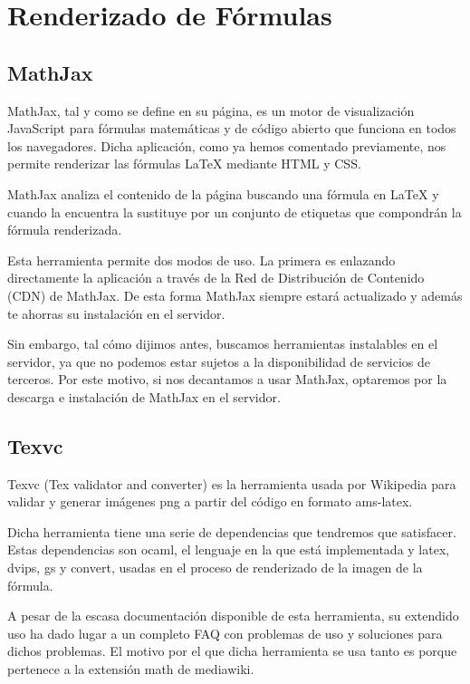 \section{Renderizado de Fórmulas}
\subsection{MathJax}

MathJax, tal y como se define en su página, es un motor de visualización JavaScript para fórmulas matemáticas y de código abierto que funciona en todos los navegadores. Dicha aplicación, como ya hemos comentado previamente, nos permite renderizar las fórmulas {\LaTeX} mediante HTML y CSS.

MathJax analiza el contenido de la página buscando una fórmula en {\LaTeX} y cuando la encuentra la sustituye por un conjunto de etiquetas que compondrán la fórmula renderizada.

Esta herramienta permite dos modos de uso. La primera es enlazando directamente la aplicación a través de la Red de Distribución de Contenido (CDN) de MathJax. De esta forma MathJax siempre estará actualizado y además te ahorras su instalación en el servidor.

Sin embargo, tal cómo dijimos antes, buscamos herramientas instalables en el servidor, ya que no podemos estar sujetos a la disponibilidad de servicios de terceros. Por este motivo, si nos decantamos a usar MathJax, optaremos por la descarga e instalación de MathJax en el servidor.

\subsection{Texvc}

Texvc (Tex validator and converter) es la herramienta usada por Wikipedia para validar y generar imágenes png a partir del código en formato ams-latex. 

Dicha herramienta tiene una serie de dependencias que tendremos que satisfacer. Estas dependencias son ocaml, el lenguaje en la que está implementada y latex, dvips, gs y convert, usadas en el proceso de renderizado de la imagen de la fórmula.

A pesar de la escasa documentación disponible de esta herramienta, su extendido uso ha dado lugar a un completo FAQ con problemas de uso y soluciones para dichos problemas. El motivo por el que dicha herramienta se usa tanto es porque pertenece a la extensión math de mediawiki.

